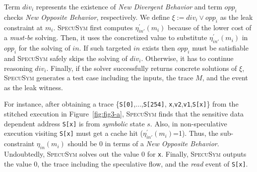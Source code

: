 \documentclass[sigconf]{acmart}
\newcommand\ignore[1]{}
\newcommand{\SpecuSym}{\textsc{SpecuSym} }
\begin{document}
\ignore{
%
\begin{multline}
  \label{eqn:leak}
  ~~
  \xi:=
  \Big(
  \mathit{div_i}
  \wedge
  \big(
  \sum_{\scriptscriptstyle \mathit{k=0}}^{\scriptscriptstyle\mathit{n}} 
  \mathit{\eta_{in''}(m_k)=}0
  \neq
  \sum_{\scriptscriptstyle \mathit{k=0}}^{\scriptscriptstyle\mathit{n}} 
  \mathit{\eta_{in''}(m_k)=}1
  \big)
  \Big)
  \vee 
  \mathit{opp_i}
  ~~
\end{multline}
%
}

\ignore{
Note that 
speculative execution not only evicts cache lines to cause new misses but also loads 
memory data into cache that benefits new hits. Since a leak refers to the noticeable 
timing variance in program runs with and without speculative execution, from 
$\mathit{opp_i}$ the amount of new misses should differ from the amount of new hits. 
And we construct the final leak constraint $\xi$ on this observation:
}


Term $\mathit{div_i}$ represents the existence of \textit{New Divergent Behavior} 
and term $\mathit{opp_i}$ checks \textit{New Opposite Behavior}, respectively. We 
define $\xi:=\mathit{div_i}\vee\mathit{opp_i}$ as the leak constraint at $\mathit{m_i}$.
\SpecuSym first computes $\mathit{\eta_{in'}^\prime(m_i)}$ because of the lower cost 
of a \textit{must-be} solving. Then, it uses the concretized value to substitute
$\mathit{\eta_{in'}^\prime(m_i)}$ in $\mathit{opp_i}$ for the solving of $\mathit{in}$. 
If such targeted $\mathit{in}$ exists then $opp_i$ must be satisfiable and \SpecuSym
safely skips the solving of $\mathit{div_i}$. Otherwise, it has to continue reasoning 
$\mathit{div_i}$. Finally, if the solver successfully returns concrete solutions
of $\xi$, \SpecuSym generates a test case including the inputs, the trace $M$, and 
the event as the leak witness.


For instance, after obtaining a trace {\small \{\texttt{S[0]},...,\texttt{S[254]},
\texttt{x},\texttt{v2},\texttt{v1},\texttt{S[x]}\}} from the stitched execution 
in Figure~\ref{fig:fig3-a}, \SpecuSym finds that the sensitive data dependent 
address {\small\texttt{S[x]}} is from \textit{symbolic} state $s$. Also, 
in non-speculative execution visiting {\small\texttt{S[x]}} must get a cache hit 
($\mathit{\eta_{in'}^\prime(m_i)}$=1). Thus, the sub-constraint $\mathit{\eta_{in}(m_i)}$ 
should be 0 in terms of a \textit{New Opposite Behavior}. Undoubtedly, \SpecuSym solves 
out the value 0 for {\small\texttt{x}}. Finally, \SpecuSym outputs the value 0, the 
trace including the speculative flow, and the \textit{read} event of {\small\texttt{S[x]}}.
\end{document}
